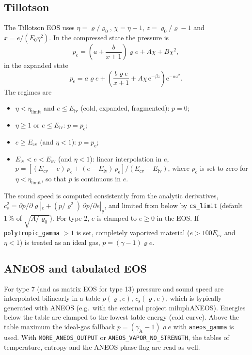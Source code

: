 \documentclass[10pt,fleqn,twoside]{article}
\newcommand{\code}[1]{\texttt{#1}}
\newcommand{\sw}[1]{\texttt{#1}}
\begin{document}
\subsection{Tillotson}
\label{sec:tillotson}
The Tillotson EOS \citep{til62,melosh1996impact} uses $\eta = \varrho/\varrho_0$, $\chi = \eta - 1$,
$z = \varrho_0/\varrho - 1$ and $x = e/(E_0\eta^2)$. In the compressed state the pressure is
\begin{equation}
 \label{eq:tillo_c}
 p_\mathrm{c} = \left(a + \frac{b}{x+1}\right)\varrho e + A\chi + B\chi^2,
\end{equation}
in the expanded state
\begin{equation}
 \label{eq:tillo_e}
 p_\mathrm{e} = a\varrho e + \left(\frac{b\varrho e}{x+1} + A\chi\,\mathrm{e}^{-\beta z}\right)
   \mathrm{e}^{-\alpha z^2}.
\end{equation}
The regimes are
\begin{itemize}
 \item $\eta < \eta_\mathrm{limit}$ and $e \leq E_\mathrm{iv}$ (cold, expanded, fragmented): $p = 0$;
 \item $\eta \geq 1$ or $e \leq E_\mathrm{iv}$: $p = p_\mathrm{c}$;
 \item $e \geq E_\mathrm{cv}$ (and $\eta < 1$): $p = p_\mathrm{e}$;
 \item $E_\mathrm{iv} < e < E_\mathrm{cv}$ (and $\eta < 1$): linear interpolation in $e$,
   $p = [(E_\mathrm{cv}-e)\,p_\mathrm{c} + (e-E_\mathrm{iv})\,p_\mathrm{e}]/(E_\mathrm{cv}-E_\mathrm{iv})$, where
   $p_\mathrm{c}$ is set to zero for $\eta < \eta_\mathrm{limit}$, so that $p$ is continuous in $e$.
\end{itemize}
The sound speed is computed consistently from the analytic derivatives,
$c_\mathrm{s}^2 = \partial p/\partial\varrho|_e + (p/\varrho^2)\,\partial p/\partial e|_\varrho$, and limited from
below by \code{cs\_limit} (default 1\,\% of $\sqrt{A/\varrho_0}$). For type 2, $e$ is clamped to $e \geq 0$ in the
EOS. If \code{polytropic\_gamma} $> 1$ is set, completely vaporized material ($e > 100 E_\mathrm{cv}$ and $\eta < 1$)
is treated as an ideal gas, $p = (\gamma-1)\varrho e$.

\subsection{ANEOS and tabulated EOS}
\label{sec:aneos}
For type 7 (and as matrix EOS for type 13) pressure and sound speed are interpolated bilinearly in a table
$p(\varrho, e)$, $c_\mathrm{s}(\varrho, e)$, which is typically generated with ANEOS (e.g.\ with the external project
miluphANEOS). Energies below the table are clamped to the lowest table energy (cold curve). Above the table maximum the
ideal-gas fallback $p = (\gamma_\mathrm{A} - 1)\varrho e$ with \code{aneos\_gamma} is used. With
\sw{MORE\_ANEOS\_OUTPUT} or \sw{ANEOS\_VAPOR\_NO\_STRENGTH}, the tables of temperature, entropy and the ANEOS phase
flag are read as well.
\end{document}
